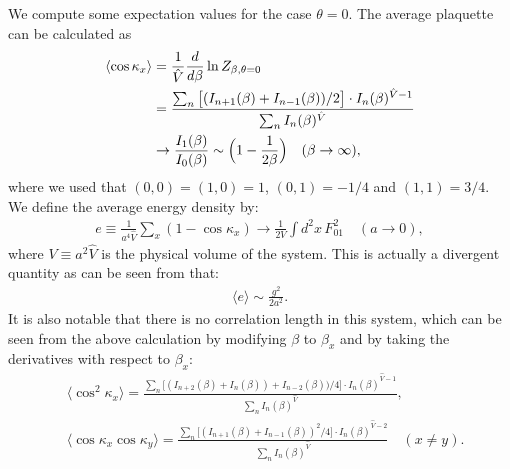 \documentclass[12pt]{article}
\begin{document}
We compute some expectation values for the case $\theta=0$.
The average plaquette can be calculated as
\begin{align}
  \langle \cos \kappa_x \rangle
  &=
    { 1\over \hat{V}} \frac{d}{d\beta} \ln Z_{\beta,\theta=0} \nonumber\\
  &=
    \frac{ \sum_n \big[(I_{n+1}(\beta) + I_{n-1}(\beta))/2\big]
    \cdot I_n(\beta)^{\hat{V}-1}}
    {\sum_n I_n(\beta)^{\hat{V}}} \nonumber\\
  &\to
    \frac{I_1(\beta)}{I_0(\beta)}
    \sim \Big(1-\frac{1}{2\beta}\Big) \quad (\beta\to \infty),
\end{align}
where we used that $(0,0)=(1,0)=1$, $(0,1)=-1/4$ and $(1,1)=3/4$.
We define the average energy density by:
\begin{align}
  e \equiv \frac{1}{a^4 \hat{V}} \sum_x (1-\cos \kappa_x)
  \to \frac{1}{2V} \int d^2x\, F_{01}^2 \quad (a\to 0),
\end{align}
where $V\equiv a^2 \hat{V}$ is the physical volume of the system.
This is actually a divergent quantity as can be seen from that:
\begin{align}
  \langle e \rangle \sim \frac{g^2}{2a^2}.
\end{align}
It is also notable that
there is no correlation length in this system,
which can be seen from the above calculation by
modifying $\beta$ to $\beta_x$ and by taking
the derivatives with respect to $\beta_x$:
\begin{align}
  &\langle \cos^2 \kappa_x \rangle
  =
    \frac{ \sum_n \big[(I_{n+2}(\beta) + I_{n}(\beta)) + I_{n-2}(\beta))/4\big]
    \cdot I_n(\beta)^{\hat{V}-1}}
    {\sum_n I_n(\beta)^{\hat{V}}}, \\
  &\langle \cos \kappa_x \cos \kappa_y \rangle
  =
    \frac{ \sum_n \big[(I_{n+1}(\beta) + I_{n-1}(\beta))^2/4\big]
    \cdot I_n(\beta)^{\hat{V}-2}}
    {\sum_n I_n(\beta)^{\hat{V}}} \quad (x\neq y).
\end{align}
\end{document}

